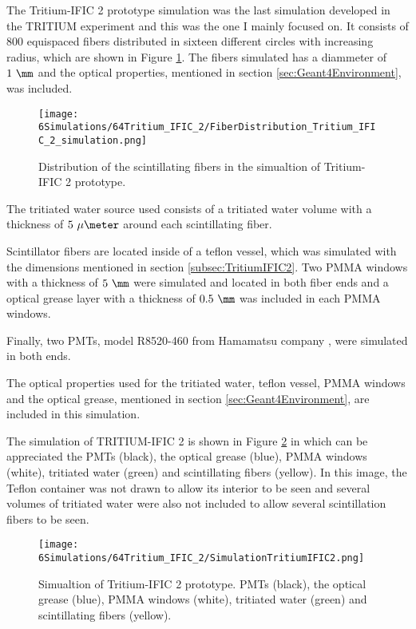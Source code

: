 The Tritium-IFIC 2 prototype simulation was the last simulation developed in the TRITIUM experiment and this was the one I mainly focused on. It consists of $800$ equispaced fibers distributed in sixteen different circles with increasing radius, which are shown in Figure \ref{fig:FibersTritiumIFIC2Simulation}. The fibers simulated has a diammeter of $1~\mm$ and the optical properties, mentioned in section \ref{sec:Geant4Environment}, was included.

\begin{figure}[h]
\centering
\texttt{[image: 6Simulations/64Tritium\_IFIC\_2/FiberDistribution\_Tritium\_IFIC\_2\_simulation.png]}
\caption{Distribution of the scintillating fibers in the simualtion of Tritium-IFIC 2 prototype.\label{fig:FibersTritiumIFIC2Simulation}}
\end{figure}

The tritiated water source used consists of a tritiated water volume with a thickness of $5~\mu\meter$ around each scintillating fiber.

Scintillator fibers are located inside of a teflon vessel, which was simulated with the dimensions mentioned in section \ref{subsec:TritiumIFIC2}. Two PMMA windows with a thickness of $5~\mm$ were simulated and located in both fiber ends and a optical grease layer with a thickness of $0.5~\mm$ was included in each PMMA windows.

Finally, two PMTs, model R8520-460 from Hamamatsu company \cite{DataSheetPMTs}, were simulated in both ends. 

The optical properties used for the tritiated water, teflon vessel, PMMA windows and the optical grease, mentioned in section \ref{sec:Geant4Environment}, are included in this simulation. 

The simulation of TRITIUM-IFIC 2 is shown in Figure \ref{fig:TritiumIFIC2Simulation} in which can be appreciated the PMTs (black), the optical grease (blue), PMMA windows (white), tritiated water (green) and scintillating fibers (yellow). In this image, the Teflon container was not drawn to allow its interior to be seen and several volumes of tritiated water were also not included to allow several scintillation fibers to be seen.

\begin{figure}[h]
\centering
\texttt{[image: 6Simulations/64Tritium\_IFIC\_2/SimulationTritiumIFIC2.png]}
\caption{Simualtion of Tritium-IFIC 2 prototype. PMTs (black), the optical grease (blue), PMMA windows (white), tritiated water (green) and scintillating fibers (yellow). \label{fig:TritiumIFIC2Simulation}}
\end{figure}

